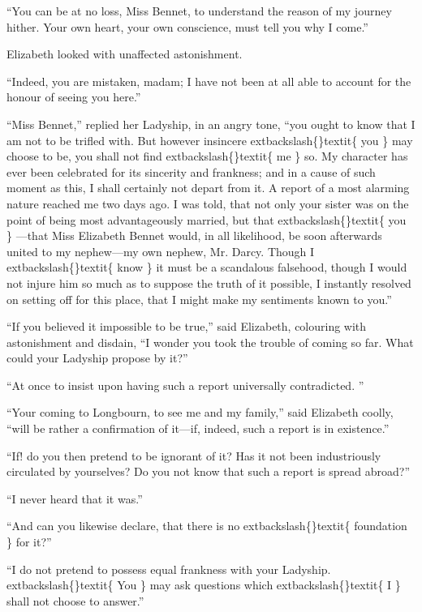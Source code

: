 \documentclass[10pt]{book}
\begin{document}
   “You can be at no loss, Miss Bennet, to understand the reason of my
journey hither. Your own heart, your own conscience, must tell you why I
come.”
  

   Elizabeth looked with unaffected astonishment.
  

   “Indeed, you are mistaken, madam; I have not been at all able to account
for the honour of seeing you here.”
  

   “Miss Bennet,” replied her Ladyship, in an angry tone, “you ought to
know that I am not to be trifled with. But however insincere
   	extbackslash\{\}textit\{
    you
   \}
   may
choose to be, you shall not find
   	extbackslash\{\}textit\{
    me
   \}
   so. My character has ever been
celebrated for its sincerity and frankness; and in a cause of such
moment as this, I shall certainly not depart from it. A report of a most
alarming nature reached me two days ago. I was told, that not only your
sister was on the point of being most advantageously married, but that
   	extbackslash\{\}textit\{
    you
   \}
   —that Miss Elizabeth Bennet would, in all likelihood, be soon
afterwards united to my nephew—my own nephew, Mr. Darcy. Though I
   	extbackslash\{\}textit\{
    know
   \}
   it must be a scandalous falsehood, though I would not injure him
so much as to suppose the truth of it possible, I instantly resolved on
setting off for this place, that I might make my sentiments known to
you.”
  

   “If you believed it impossible to be true,” said Elizabeth, colouring
with astonishment and disdain, “I wonder you took the trouble of coming
so far. What could your Ladyship propose by it?”
  

   “At once to insist upon having such a report universally contradicted.
   ”
  

   “Your coming to Longbourn, to see me and my family,” said Elizabeth
coolly, “will be rather a confirmation of it—if, indeed, such a report
is in existence.”
  

   “If! do you then pretend to be ignorant of it? Has it not been
industriously circulated by yourselves? Do you not know that such a
report is spread abroad?”
  

   “I never heard that it was.”
  

   “And can you likewise declare, that there is no
   	extbackslash\{\}textit\{
    foundation
   \}
   for it?”
  

   “I do not pretend to possess equal frankness with your Ladyship.
   	extbackslash\{\}textit\{
    You
   \}
   may ask questions which
   	extbackslash\{\}textit\{
    I
   \}
   shall not choose to answer.”
  
\end{document}
